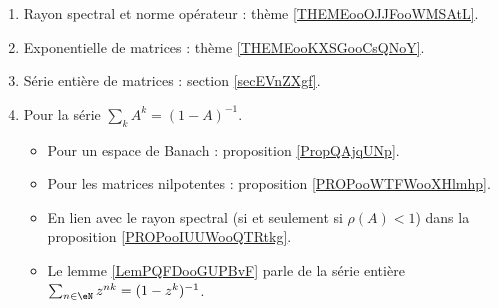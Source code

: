        \label{THEMEooPQKDooTAVKFH}

\begin{enumerate}
    \item
        Rayon spectral et norme opérateur : thème \ref{THEMEooOJJFooWMSAtL}.
    \item
        Exponentielle de matrices : thème \ref{THEMEooKXSGooCsQNoY}.
    \item
        Série entière de matrices : section \ref{secEVnZXgf}.
    \item
        Pour la série \( \sum_kA^k=(1-A)^{-1}\).
        \begin{itemize}
            \item Pour un espace de Banach : proposition \ref{PropQAjqUNp}.
            \item Pour les matrices nilpotentes : proposition \ref{PROPooWTFWooXHlmhp}.
            \item En lien avec le rayon spectral (si et seulement si \( \rho(A)<1\)) dans la proposition \ref{PROPooIUUWooQTRtkg}.
            \item Le lemme \ref{LemPQFDooGUPBvF} parle de la série entière \( \sum_{n\in \eN}z^{nk}=(1-z^k)^{-1}\).
        \end{itemize}
\end{enumerate}
